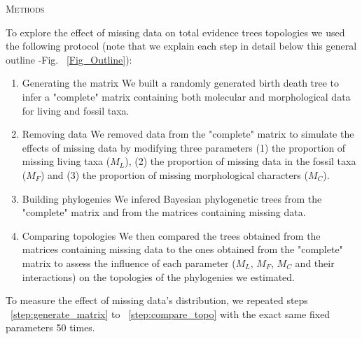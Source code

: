 \documentclass[12pt,letterpaper]{article}
\renewcommand{\section}[1]{%
\bigskip
\begin{center}
\begin{Large}
\normalfont\scshape #1
\medskip
\end{Large}
\end{center}}
\begin{document}

\section{Methods} %
To explore the effect of missing data on total evidence trees topologies we used the following protocol (note that we explain each step in detail below this general outline -Fig. ~\ref{Fig_Outline}):
\begin{enumerate}
\item{Generating the matrix}
\label{step:generate_matrix}
We built a randomly generated birth death tree to infer a "complete" matrix containing both molecular and morphological data for living and fossil taxa.
\item{Removing data}
\label{step:remove_data}
We removed data from the "complete" matrix to simulate the effects of missing data by modifying three parameters (1) the proportion of missing living taxa ($M_{L}$), (2) the proportion of missing data in the fossil taxa ($M_{F}$) and (3) the proportion of missing morphological characters ($M_{C}$).
\item{Building phylogenies}
\label{step:build_phylo}
We infered Bayesian phylogenetic trees from the "complete" matrix and from the matrices containing missing data.
\item{Comparing topologies}
\label{step:compare_topo}
We then compared the trees obtained from the matrices containing missing data to the ones obtained from the "complete" matrix to assess the influence of each parameter ($M_{L}$, $M_{F}$, $M_{C}$ and their interactions) on the topologies of the phylogenies we estimated.
\end{enumerate}
To measure the effect of missing data’s distribution, we repeated steps ~\ref{step:generate_matrix} to ~\ref{step:compare_topo} with the exact same fixed parameters 50 times.
\end{document}
